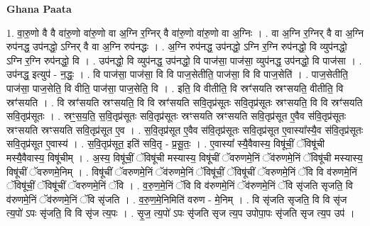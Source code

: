 \documentclass[17pt]{extarticle}
\begin{document}
\textbf{Ghana Paata } \newline

1. वा॒रु॒णो वै वै वा॑रु॒णो वा॑रु॒णो वा अ॒ग्नि र॒ग्निर् वै वा॑रु॒णो वा॑रु॒णो वा अ॒ग्निः । . वा अ॒ग्नि र॒ग्निर् वै वा अ॒ग्नि रुप॑नद्ध॒ उप॑नद्धो॒ ऽग्निर् वै वा अ॒ग्नि रुप॑नद्धः । . अ॒ग्नि रुप॑नद्ध॒ उप॑नद्धो॒ ऽग्नि र॒ग्नि रुप॑नद्धो॒ वि व्युप॑नद्धो॒ ऽग्नि र॒ग्नि रुप॑नद्धो॒ वि । . उप॑नद्धो॒ वि व्युप॑नद्ध॒ उप॑नद्धो॒ वि पाज॑सा॒ पाज॑सा॒ व्युप॑नद्ध॒ उप॑नद्धो॒ वि पाज॑सा । . उप॑नद्ध॒ इत्युप॑ - न॒द्धः॒ । . वि पाज॑सा॒ पाज॑सा॒ वि वि पाज॒सेतीति॒ पाज॑सा॒ वि वि पाज॒सेति॑ । . पाज॒सेतीति॒ पाज॑सा॒ पाज॒सेति॒ वि वीति॒ पाज॑सा॒ पाज॒सेति॒ वि । . इति॒ वि वीतीति॒ वि स्रꣳ॑सयति स्रꣳसयति॒ वीतीति॒ वि स्रꣳ॑सयति । . वि स्रꣳ॑सयति स्रꣳसयति॒ वि वि स्रꣳ॑सयति सवि॒तृप्र॑सूतः सवि॒तृप्र॑सूतः स्रꣳसयति॒ वि वि स्रꣳ॑सयति सवि॒तृप्र॑सूतः । . स्रꣳ॒॒स॒य॒ति॒ स॒वि॒तृप्र॑सूतः सवि॒तृप्र॑सूतः स्रꣳसयति स्रꣳसयति सवि॒तृप्र॑सूत ए॒वैव स॑वि॒तृप्र॑सूतः स्रꣳसयति स्रꣳसयति सवि॒तृप्र॑सूत ए॒व । . स॒वि॒तृप्र॑सूत ए॒वैव स॑वि॒तृप्र॑सूतः सवि॒तृप्र॑सूत ए॒वास्या᳚स्यै॒व स॑वि॒तृप्र॑सूतः सवि॒तृप्र॑सूत ए॒वास्य॑ । . स॒वि॒तृप्र॑सूत॒ इति॑ सवि॒तृ - प्र॒सू॒तः॒ । . ए॒वास्या᳚ स्यै॒वैवास्य॒ विषू॑चीं॒ ॅविषू॑ची मस्यै॒वैवास्य॒ विषू॑चीम् । . अ॒स्य॒ विषू॑चीं॒ ॅविषू॑ची मस्यास्य॒ विषू॑चीं ॅवरुणमे॒निं ॅव॑रुणमे॒निं ॅविषू॑ची मस्यास्य॒ विषू॑चीं ॅवरुणमे॒निम् । . विषू॑चीं ॅवरुणमे॒निं ॅव॑रुणमे॒निं ॅविषू॑चीं॒ ॅविषू॑चीं ॅवरुणमे॒निं ॅवि वि व॑रुणमे॒निं ॅविषू॑चीं॒ ॅविषू॑चीं ॅवरुणमे॒निं ॅवि । . व॒रु॒ण॒मे॒निं ॅवि वि व॑रुणमे॒निं ॅव॑रुणमे॒निं ॅवि सृ॑जति सृजति॒ वि व॑रुणमे॒निं ॅव॑रुणमे॒निं ॅवि सृ॑जति । . व॒रु॒ण॒मे॒निमिति॑ वरुण - मे॒निम् । . वि सृ॑जति सृजति॒ वि वि सृ॑ज त्य॒पो॑ ऽपः सृ॑जति॒ वि वि सृ॑ज त्य॒पः । . सृ॒ज॒ त्य॒पो॑ ऽपः सृ॑जति सृज त्य॒प उपोपा॒पः सृ॑जति सृज त्य॒प उप॑ । \newline
\end{document}
